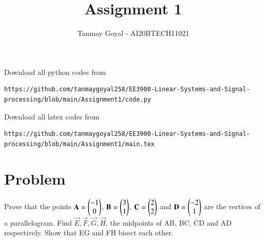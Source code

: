 \documentclass[journal,12pt,twocolumn]{IEEEtran}
\begin{document}
     \def\topbox#1{\raisebox{-\baselineskip}[0in][0in]{#1}}
     \def\midbox#1{\raisebox{-0.5\baselineskip}[0in][0in]{#1}}
\vspace{3cm}
\title{Assignment 1}
\author{Tanmay Goyal - AI20BTECH11021}
\maketitle
\newpage
\bigskip
\renewcommand{\thefigure}{\theenumi}
\renewcommand{\thetable}{\theenumi}
Download all python codes from 
\begin{lstlisting}
https://github.com/tanmaygoyal258/EE3900-Linear-Systems-and-Signal-processing/blob/main/Assignment1/code.py
\end{lstlisting}
Download all latex codes from 
\begin{lstlisting}
https://github.com/tanmaygoyal258/EE3900-Linear-Systems-and-Signal-processing/blob/main/Assignment1/main.tex
\end{lstlisting}
\section{Problem}
 Prove that the points 
$\mathbf{A} = \begin{pmatrix}-1\\0\end{pmatrix}$,
$\mathbf{B} = \begin{pmatrix}3\\1\end{pmatrix}$,
$\mathbf{C} = \begin{pmatrix}2\\2\end{pmatrix}$ and 
$\mathbf{D} = \begin{pmatrix}-2\\1\end{pmatrix}$
are the vertices of a parallelogram. Find $\vec{E} , \vec{F} , \vec{G} , \vec{H}$, the midpoints of AB, BC, CD and AD respectively. Show that EG and FH bisect each other.
\end{document}

